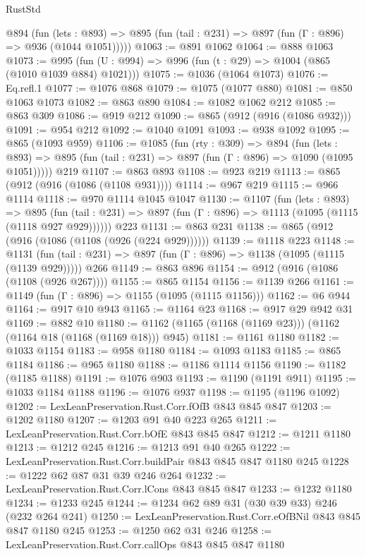 \begin{lexlean}{RustStd}
\begin{coremodule}
    @894
      (fun (lets : @893) =>
      @895 (fun (tail : @231) => @897 (fun (Γ : @896) => @936 (@1044 @1051)))))
@1063 := @891 @1062
@1064 := @888 @1063
@1073 := @995 (fun (U : @994) => @996 (fun (t : @29) => @1004 (@865 (@1010 @1039 @884) @1021)))
@1075 := @1036 (@1064 @1073)
@1076 := Eq.refl.{1}
@1077 := @1076 @868
@1079 := @1075 (@1077 @880)
@1081 := @850 @1063 @1073
@1082 := @863 @890
@1084 := @1082 @1062 @212
@1085 := @863 @309
@1086 := @919 @212
@1090 := @865 (@912 (@916 (@1086 @932)))
@1091 := @954 @212
@1092 := @1040 @1091
@1093 := @938 @1092
@1095 := @865 (@1093 @959)
@1106 := @1085
    (fun (rty : @309) =>
    @894
      (fun (lets : @893) =>
      @895 (fun (tail : @231) => @897 (fun (Γ : @896) => @1090 (@1095 @1051)))))
    @219
@1107 := @863 @893
@1108 := @923 @219
@1113 := @865 (@912 (@916 (@1086 (@1108 @931))))
@1114 := @967 @219
@1115 := @966 @1114
@1118 := @970 @1114 @1045 @1047
@1130 := @1107
    (fun (lets : @893) =>
    @895 (fun (tail : @231) => @897 (fun (Γ : @896) => @1113 (@1095 (@1115 (@1118 @927 @929))))))
    @223
@1131 := @863 @231
@1138 := @865 (@912 (@916 (@1086 (@1108 (@926 (@224 @929))))))
@1139 := @1118 @223
@1148 := @1131
    (fun (tail : @231) => @897 (fun (Γ : @896) => @1138 (@1095 (@1115 (@1139 @929)))))
    @266
@1149 := @863 @896
@1154 := @912 (@916 (@1086 (@1108 (@926 @267))))
@1155 := @865 @1154
@1156 := @1139 @266
@1161 := @1149 (fun (Γ : @896) => @1155 (@1095 (@1115 @1156)))
@1162 := @6 @944
@1164 := @917 @10 @943
@1165 := @1164 @23
@1168 := @917 @29 @942 @31
@1169 := @882 @10
@1180 := @1162 (@1165 (@1168 (@1169 @23))) (@1162 (@1164 @18 (@1168 (@1169 @18))) @945)
@1181 := @1161 @1180
@1182 := @1033 @1154
@1183 := @958 @1180
@1184 := @1093 @1183
@1185 := @865 @1184
@1186 := @965 @1180
@1188 := @1186 @1114 @1156
@1190 := @1182 (@1185 @1188)
@1191 := @1076 @903
@1193 := @1190 (@1191 @911)
@1195 := @1033 @1184 @1188
@1196 := @1076 @937
@1198 := @1195 (@1196 @1092)
@1202 := LexLeanPreservation.Rust.Corr.fOfB @843 @845 @847
@1203 := @1202 @1180
@1207 := @1203 @91 @40 @223 @265
@1211 := LexLeanPreservation.Rust.Corr.bOfE @843 @845 @847
@1212 := @1211 @1180
@1213 := @1212 @245
@1216 := @1213 @91 @40 @265
@1222 := LexLeanPreservation.Rust.Corr.buildPair @843 @845 @847 @1180 @245
@1228 := @1222 @62 @87 @31 @39 @246 @264
@1232 := LexLeanPreservation.Rust.Corr.lCons @843 @845 @847
@1233 := @1232 @1180
@1234 := @1233 @245
@1244 := @1234 @62 @89 @31 (@30 @39 @33) @246 (@232 @264 @241)
@1250 := LexLeanPreservation.Rust.Corr.eOfBNil @843 @845 @847 @1180 @245
@1253 := @1250 @62 @31 @246
@1258 := LexLeanPreservation.Rust.Corr.callOps @843 @845 @847 @1180

\end{coremodule}
\end{lexlean}
